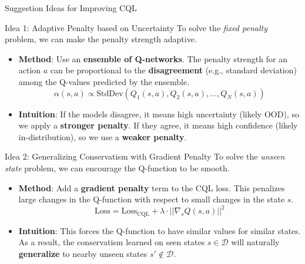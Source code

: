 \documentclass[11pt]{beamer}
\begin{document}
\begin{frame}{Suggestion Ideas for Improving CQL}
    \begin{block}{Idea 1: Adaptive Penalty based on Uncertainty}
        To solve the \textit{fixed penalty} problem, we can make the penalty strength adaptive.
        \begin{itemize}
            \item \textbf{Method}: Use an \textbf{ensemble of Q-networks}. The penalty strength for an action $a$ can be proportional to the \textbf{disagreement} (e.g., standard deviation) among the Q-values predicted by the ensemble.
            \[
                \alpha(s,a) \propto \text{StdDev}\left(Q_1(s,a), Q_2(s,a), \dots, Q_N(s,a)\right)
            \]
            \item \textbf{Intuition}: If the models disagree, it means high uncertainty (likely OOD), so we apply a \textbf{stronger penalty}. If they agree, it means high confidence (likely in-distribution), so we use a \textbf{weaker penalty}.
        \end{itemize}
    \end{block}

    \begin{block}{Idea 2: Generalizing Conservatism with Gradient Penalty}
        To solve the \textit{unseen state} problem, we can encourage the Q-function to be smooth.
        \begin{itemize}
            \item \textbf{Method}: Add a \textbf{gradient penalty} term to the CQL loss. This penalizes large changes in the Q-function with respect to small changes in the state $s$.
            \[
                \text{Loss} = \text{Loss}_{\text{CQL}} + \lambda \cdot ||\nabla_s Q(s,a)||^2
            \]
            \item \textbf{Intuition}: This forces the Q-function to have similar values for similar states. As a result, the conservatism learned on seen states $s \in \mathcal{D}$ will naturally \textbf{generalize} to nearby unseen states $s' \notin \mathcal{D}$.
        \end{itemize}
    \end{block}
\end{frame}

    
\end{document}
